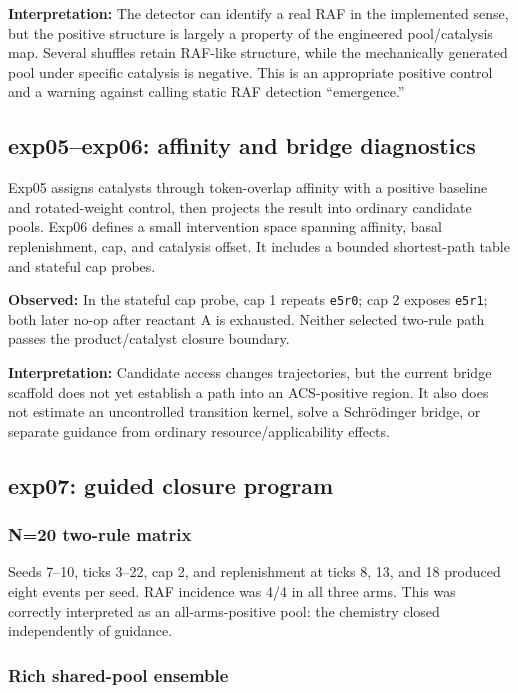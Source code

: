 \documentclass[11pt]{article}
\newcommand{\code}[1]{\texttt{#1}}
\newcommand{\obs}{\textbf{Observed: }}
\newcommand{\interp}{\textbf{Interpretation: }}
\begin{document}
\interp The detector can identify a real RAF in the implemented sense, but the
positive structure is largely a property of the engineered pool/catalysis
map.  Several shuffles retain RAF-like structure, while the mechanically
generated pool under specific catalysis is negative.  This is an appropriate
positive control and a warning against calling static RAF detection
``emergence.''

\subsection{exp05--exp06: affinity and bridge diagnostics}

Exp05 assigns catalysts through token-overlap affinity with a positive
baseline and rotated-weight control, then projects the result into ordinary
candidate pools.  Exp06 defines a small intervention space spanning affinity,
basal replenishment, cap, and catalysis offset.  It includes a bounded
shortest-path table and stateful cap probes.

\obs In the stateful cap probe, cap 1 repeats \code{e5r0}; cap 2 exposes
\code{e5r1}; both later no-op after reactant A is exhausted.  Neither selected
two-rule path passes the product/catalyst closure boundary.

\interp Candidate access changes trajectories, but the current bridge scaffold
does not yet establish a path into an ACS-positive region.  It also does not
estimate an uncontrolled transition kernel, solve a Schr\"odinger bridge, or
separate guidance from ordinary resource/applicability effects.

\subsection{exp07: guided closure program}

\subsubsection{N=20 two-rule matrix}

Seeds 7--10, ticks 3--22, cap 2, and replenishment at ticks 8, 13, and 18
produced eight events per seed.  RAF incidence was 4/4 in all three arms.
This was correctly interpreted as an all-arms-positive pool: the chemistry
closed independently of guidance.

\subsubsection{Rich shared-pool ensemble}
\end{document}
